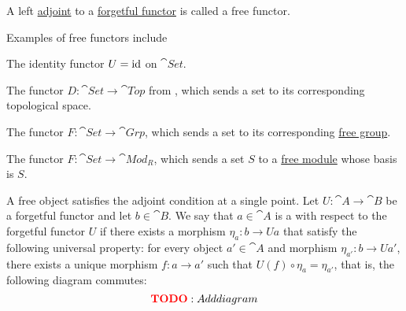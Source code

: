 \begin{definition}\label{def:free_functor}\mcite\cite{nLab:free_object}
  A left \hyperref[subsec:adjoint_functors]{adjoint} to a \hyperref[def:forgetful_functor]{forgetful functor} is called a free functor.
\end{definition}

\begin{example}\label{ex:free_functors}
  Examples of free functors include

  \begin{thmenum}
    \item The identity functor \( U = \operatorname{id} \) on \( \cat{Set} \).
    \item The functor \( D: \cat{Set} \to \cat{Top} \) from , which sends a set to its corresponding topological space.
    \item The functor \( F: \cat{Set} \to \cat{Grp} \), which sends a set to its corresponding \hyperref[def:free_group]{free group}.
    \item The functor \( F: \cat{Set} \to \cat{Mod}_R \), which sends a set \( S \) to a \hyperref[def:free_left_module]{free module} whose basis is \( S \).
  \end{thmenum}
\end{example}

\begin{definition}\label{def:free_object}\mcite\cite{nLab:free_object}
  A free object satisfies the adjoint condition at a single point. Let \( U: \cat{A} \to \cat{B} \) be a forgetful functor and let \( b \in \cat{B} \). We say that \( a \in \cat{A} \) is a  with respect to the forgetful functor \( U \) if there exists a morphism \( \eta_{a}: b \to Ua \) that satisfy the following universal property: for every object \( a' \in \cat{A} \) and morphism \( \eta_{a'}: b \to Ua' \), there exists a unique morphism \( f: a \to a' \) such that \( U(f) \circ \eta_a = \eta_{a'} \), that is, the following diagram commutes:
  \begin{equation*}
    \todo{Add diagram}\iffalse\begin{mplibcode}
      beginfig(1);
      input metapost/graphs;

      v1 := thelabel("$b$", origin);
      v2 := thelabel("$U(a)$", (-1, -1) scaled u);
      v3 := thelabel("$U(a')$", (1, -1) scaled u);

      a1 := straight_arc(v1, v2);
      a2 := straight_arc(v1, v3);

      d1 := straight_arc(v2, v3);

      draw_vertices(v);
      draw_arcs(a);

      drawarrow d1 dotted;

      label.ulft("$\eta_{a}$", straight_arc_midpoint of a1);
      label.urt("$\eta_{a'}$", straight_arc_midpoint of a2);
      label.top("$U(f)$", straight_arc_midpoint of d1);
      endfig;
    \end{mplibcode}\fi
  \end{equation*}
\end{definition}
